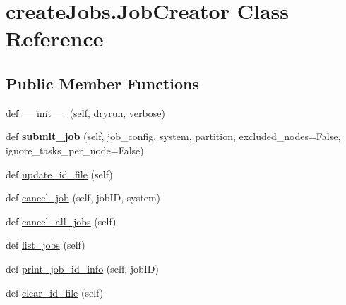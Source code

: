 \hypertarget{classcreate_jobs_1_1_job_creator}{}\section{create\+Jobs.\+Job\+Creator Class Reference}
\label{classcreate_jobs_1_1_job_creator}
\subsection*{Public Member Functions}
\begin{DoxyCompactItemize}
\item 
def \mbox{\hyperlink{classcreate_jobs_1_1_job_creator_aa4dd9a3ec7e043c0664a1472f668ddd5}{\+\_\+\+\_\+init\+\_\+\+\_\+}} (self, dryrun, verbose)
\item 
\mbox{\label{classcreate_jobs_1_1_job_creator_a55ea2f0de5b862ba2834fa37c8a09c4d}} 
def {\bfseries submit\+\_\+job} (self, job\+\_\+config, system, partition, excluded\+\_\+nodes=False, ignore\+\_\+tasks\+\_\+per\+\_\+node=False)
\item 
def \mbox{\hyperlink{classcreate_jobs_1_1_job_creator_a6c2d2cf3102c800e5bdb17d7dc866e0c}{update\+\_\+id\+\_\+file}} (self)
\item 
def \mbox{\hyperlink{classcreate_jobs_1_1_job_creator_a4fb879d60cf6a4acf21d74cc7f5fe781}{cancel\+\_\+job}} (self, job\+ID, system)
\item 
def \mbox{\hyperlink{classcreate_jobs_1_1_job_creator_a01cc2f73e0ef5907752b055543737bfa}{cancel\+\_\+all\+\_\+jobs}} (self)
\item 
def \mbox{\hyperlink{classcreate_jobs_1_1_job_creator_a8c9ff9c96765e9a3b013e7dcadcbd9a1}{list\+\_\+jobs}} (self)
\item 
def \mbox{\hyperlink{classcreate_jobs_1_1_job_creator_ae0b10eae3c888ae05ec48cab77af2abf}{print\+\_\+job\+\_\+id\+\_\+info}} (self, job\+ID)
\item 
def \mbox{\hyperlink{classcreate_jobs_1_1_job_creator_ac17d5c68fafd5cf85a3d71b6e44faab3}{clear\+\_\+id\+\_\+file}} (self)
\end{DoxyCompactItemize}
